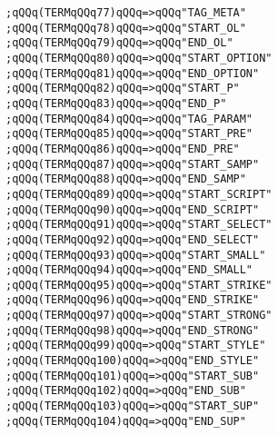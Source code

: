 \verb|;qQQq(TERMqQQq77)qQQq=>qQQq"TAG_META"|\newline
\verb|;qQQq(TERMqQQq78)qQQq=>qQQq"START_OL"|\newline
\verb|;qQQq(TERMqQQq79)qQQq=>qQQq"END_OL"|\newline
\verb|;qQQq(TERMqQQq80)qQQq=>qQQq"START_OPTION"|\newline
\verb|;qQQq(TERMqQQq81)qQQq=>qQQq"END_OPTION"|\newline
\verb|;qQQq(TERMqQQq82)qQQq=>qQQq"START_P"|\newline
\verb|;qQQq(TERMqQQq83)qQQq=>qQQq"END_P"|\newline
\verb|;qQQq(TERMqQQq84)qQQq=>qQQq"TAG_PARAM"|\newline
\verb|;qQQq(TERMqQQq85)qQQq=>qQQq"START_PRE"|\newline
\verb|;qQQq(TERMqQQq86)qQQq=>qQQq"END_PRE"|\newline
\verb|;qQQq(TERMqQQq87)qQQq=>qQQq"START_SAMP"|\newline
\verb|;qQQq(TERMqQQq88)qQQq=>qQQq"END_SAMP"|\newline
\verb|;qQQq(TERMqQQq89)qQQq=>qQQq"START_SCRIPT"|\newline
\verb|;qQQq(TERMqQQq90)qQQq=>qQQq"END_SCRIPT"|\newline
\verb|;qQQq(TERMqQQq91)qQQq=>qQQq"START_SELECT"|\newline
\verb|;qQQq(TERMqQQq92)qQQq=>qQQq"END_SELECT"|\newline
\verb|;qQQq(TERMqQQq93)qQQq=>qQQq"START_SMALL"|\newline
\verb|;qQQq(TERMqQQq94)qQQq=>qQQq"END_SMALL"|\newline
\verb|;qQQq(TERMqQQq95)qQQq=>qQQq"START_STRIKE"|\newline
\verb|;qQQq(TERMqQQq96)qQQq=>qQQq"END_STRIKE"|\newline
\verb|;qQQq(TERMqQQq97)qQQq=>qQQq"START_STRONG"|\newline
\verb|;qQQq(TERMqQQq98)qQQq=>qQQq"END_STRONG"|\newline
\verb|;qQQq(TERMqQQq99)qQQq=>qQQq"START_STYLE"|\newline
\verb|;qQQq(TERMqQQq100)qQQq=>qQQq"END_STYLE"|\newline
\verb|;qQQq(TERMqQQq101)qQQq=>qQQq"START_SUB"|\newline
\verb|;qQQq(TERMqQQq102)qQQq=>qQQq"END_SUB"|\newline
\verb|;qQQq(TERMqQQq103)qQQq=>qQQq"START_SUP"|\newline
\verb|;qQQq(TERMqQQq104)qQQq=>qQQq"END_SUP"|\newline
